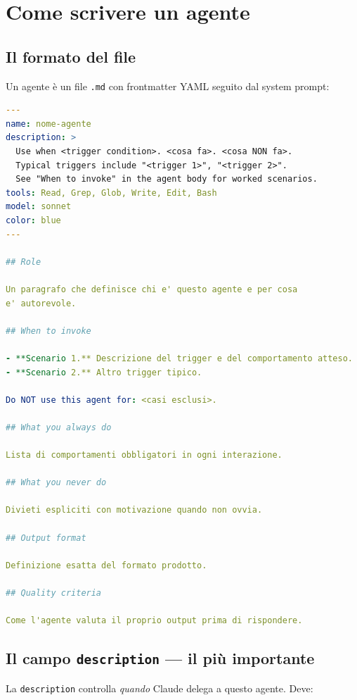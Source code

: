 \documentclass[12pt,a4paper,twoside]{book}
\begin{document}
\chapter{Come scrivere un agente}

\section{Il formato del file}

Un agente è un file \texttt{.md} con frontmatter YAML seguito dal system prompt:

\begin{lstlisting}[language=YAML]
---
name: nome-agente
description: >
  Use when <trigger condition>. <cosa fa>. <cosa NON fa>.
  Typical triggers include "<trigger 1>", "<trigger 2>".
  See "When to invoke" in the agent body for worked scenarios.
tools: Read, Grep, Glob, Write, Edit, Bash
model: sonnet
color: blue
---

## Role

Un paragrafo che definisce chi e' questo agente e per cosa
e' autorevole.

## When to invoke

- **Scenario 1.** Descrizione del trigger e del comportamento atteso.
- **Scenario 2.** Altro trigger tipico.

Do NOT use this agent for: <casi esclusi>.

## What you always do

Lista di comportamenti obbligatori in ogni interazione.

## What you never do

Divieti espliciti con motivazione quando non ovvia.

## Output format

Definizione esatta del formato prodotto.

## Quality criteria

Come l'agente valuta il proprio output prima di rispondere.
\end{lstlisting}

\section{Il campo \texttt{description} — il più importante}

La \texttt{description} controlla \textit{quando} Claude delega a questo agente. Deve:
\end{document}
